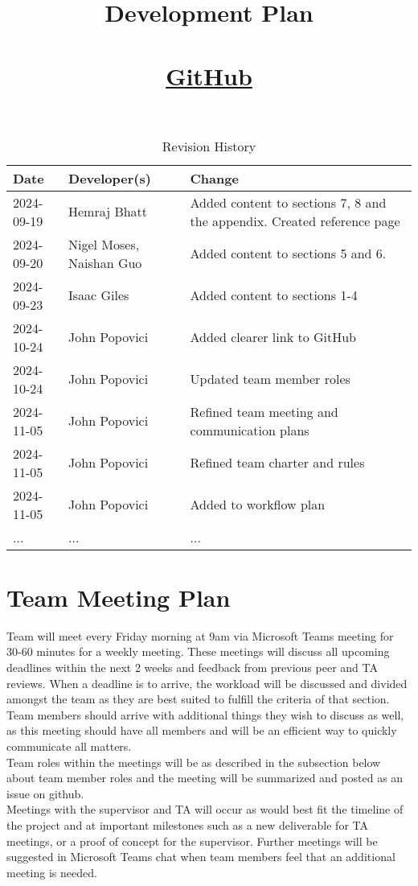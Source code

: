 \documentclass{article}
\title{Development Plan\\\progname\\\href{https://github.com/John-Popovici/duel-of-the-eights.git}{GitHub}}
\author{\authname}
\date{}
\begin{document}
\maketitle

\begin{table}[hp]
\caption{Revision History} \label{TblRevisionHistory}
\begin{tabularx}{\textwidth}{llX}
\toprule
\textbf{Date} & \textbf{Developer(s)} & \textbf{Change}\\
\midrule
2024-09-19 & Hemraj Bhatt & Added content to sections 7, 8 and the appendix. Created reference page\\
2024-09-20 & Nigel Moses, Naishan Guo & Added content to sections 5 and 6.\\
2024-09-23 & Isaac Giles & Added content to sections 1-4\\
2024-10-24 & John Popovici & Added clearer link to GitHub\\
2024-10-24 & John Popovici & Updated team member roles\\
2024-11-05 & John Popovici & Refined team meeting and communication plans\\
2024-11-05 & John Popovici & Refined team charter and rules\\
2024-11-05 & John Popovici & Added to workflow plan\\
... & ... & ...\\
\bottomrule
\end{tabularx}
\end{table}

\newpage
\section{Team Meeting Plan}

Team will meet every Friday morning at 9am via Microsoft Teams meeting for 30-60 minutes for a weekly meeting. These meetings will discuss all upcoming deadlines within the next 2 weeks and feedback from previous peer and TA reviews. When a deadline is to arrive, the workload will be discussed and divided amongst the team as they are best suited to fulfill the criteria of that section.
Team members should arrive with additional things they wish to discuss as well, as this meeting should have all members and will be an efficient way to quickly communicate all matters.\\
Team roles within the meetings will be as described in the subsection below about team member roles and the meeting will be summarized and posted as an issue on github.\\
Meetings with the supervisor and TA will occur as would best fit the timeline of the project and at important milestones such as a new deliverable for TA meetings, or a proof of concept for the supervisor.
Further meetings will be suggested in Microsoft Teams chat when team members feel that an additional meeting is needed.
\end{document}
